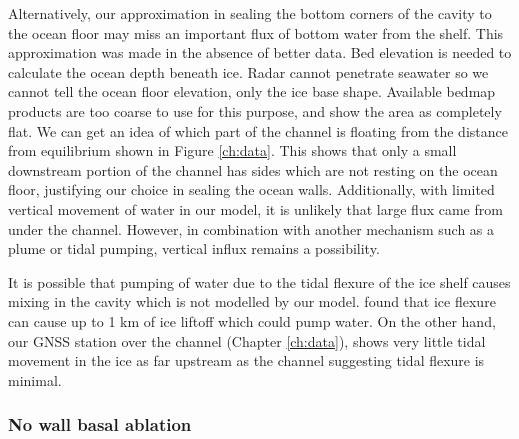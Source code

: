 Alternatively, our approximation in sealing the bottom corners of the cavity to the ocean floor may miss an important flux of bottom water from the shelf. This approximation was made in the absence of better data. Bed elevation is needed to calculate the ocean depth beneath ice.  Radar cannot penetrate seawater so we cannot tell the ocean floor elevation, only the ice base shape. Available bedmap products \citep[e.g.]{fretwell2013bedmap2} are too coarse to use for this purpose, and show the area as completely flat. 
We can get an idea of which part of the channel is floating from the distance from equilibrium shown in Figure \ref{ch:data}. This shows that only a small downstream portion of the channel has sides which are not resting on the ocean floor, justifying our choice in sealing the ocean walls. Additionally, with limited vertical movement of water in our model, it is unlikely that large flux came from under the channel. However, in combination with another mechanism such as a plume or tidal pumping, vertical influx remains a possibility.


It is possible that pumping of water due to the tidal flexure of the ice shelf causes mixing in the cavity which is not modelled by our model.  \cite{walker2013ice} found that ice flexure can cause up to 1 km of ice liftoff which could pump water. On the other hand, our GNSS station over the channel (Chapter \ref{ch:data}), shows very little tidal movement in the ice as far upstream as the channel suggesting tidal flexure is minimal. 



\subsubsection{No wall basal ablation}

